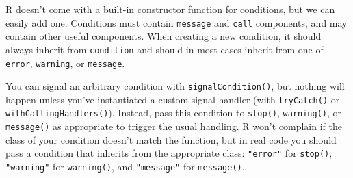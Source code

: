 R doesn't come with a built-in constructor function for conditions, but
we can easily add one. Conditions must contain \texttt{message} and
\texttt{call} components, and may contain other useful components. When
creating a new condition, it should always inherit from
\texttt{condition} and should in most cases inherit from one of
\texttt{error}, \texttt{warning}, or \texttt{message}.

\begin{Shaded}
\begin{Highlighting}[]
\StringTok{ } \NormalTok{(}\OperatorTok{-}
  \NormalTok{(}
     \NormalTok{),}
    \NormalTok{(}
\NormalTok{  )}
\NormalTok{\}}
\StringTok{ }\NormalTok{)}
\end{Highlighting}
\end{Shaded}

You can signal an arbitrary condition with \texttt{signalCondition()},
but nothing will happen unless you've instantiated a custom signal
handler (with \texttt{tryCatch()} or \texttt{withCallingHandlers()}).
Instead, pass this condition to \texttt{stop()}, \texttt{warning()}, or
\texttt{message()} as appropriate to trigger the usual handling. R won't
complain if the class of your condition doesn't match the function, but
in real code you should pass a condition that inherits from the
appropriate class: \texttt{"error"} for \texttt{stop()},
\texttt{"warning"} for \texttt{warning()}, and \texttt{"message"} for
\texttt{message()}. 

\begin{Shaded}
\begin{Highlighting}[]
\StringTok{ }\NormalTok{(}\NormalTok{(}\NormalTok{, }\NormalTok{), }\NormalTok{)}
\StringTok{ }\NormalTok{(}\NormalTok{(}\NormalTok{, }\NormalTok{), }\NormalTok{)}
\StringTok{ }\NormalTok{(}\NormalTok{(}\NormalTok{, }\NormalTok{), }\NormalTok{)}
\end{Highlighting}
\end{Shaded}

